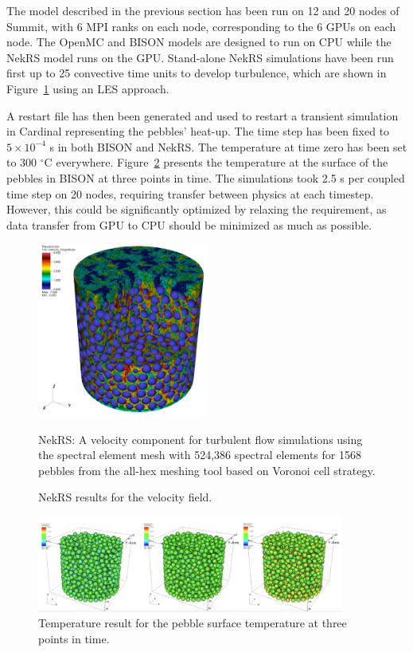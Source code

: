 The model described in the previous section has been run on 12 and 20 nodes of Summit, with 6 MPI ranks on each node, corresponding to the 6 GPUs on each node. The OpenMC and BISON models are designed to run on CPU while the NekRS model runs on the GPU. Stand-alone NekRS simulations have been run first up to 25 convective time units to develop turbulence, which are shown in Figure~\ref{f:ndemo3} using an LES approach.

A restart file has then been generated and used to restart a transient simulation in Cardinal representing the pebbles' heat-up. The time step has been fixed to $5\times 10^{-4}$ s in both BISON and NekRS. The temperature at time zero has been set to 300 $^{\circ}$C everywhere. Figure~\ref{f:ndemo4} presents the temperature at the surface of the pebbles in BISON at three points in time. The simulations took 2.5 s per coupled time step on 20 nodes, requiring transfer between physics at each timestep. However, this could be significantly optimized by relaxing the requirement, as data transfer from GPU to CPU should be minimized as much as possible.

\begin{figure}[!h]
\centering
\includegraphics[clip=true,width=0.5\textwidth]{Figures/ndemo_r3}
\caption{NekRS: A velocity component for turbulent flow simulations using the spectral element mesh 
with 524,386 spectral elements for 1568 pebbles from the all-hex meshing tool based on Voronoi cell strategy. }
\caption{NekRS results for the velocity field.}
\label{f:ndemo3}
\end{figure}


\begin{figure}[!h]
\centering
\includegraphics[clip=true,width=0.9\textwidth]{Figures/ndemo_r4}
\caption{Temperature result for the pebble surface temperature at three points in time.}
\label{f:ndemo4}
\end{figure}

